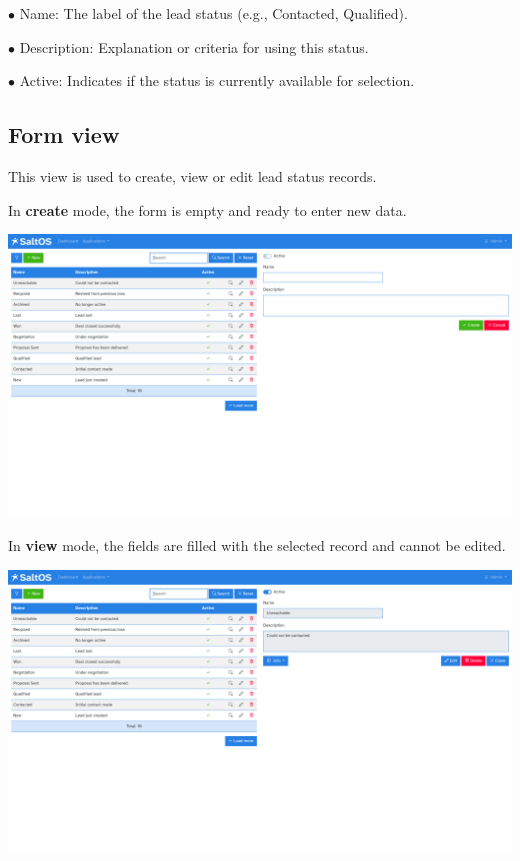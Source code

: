 \documentclass[a4paper]{article}
\begin{document}
\begin{compactitem}
\item[\color{myblue}$\bullet$] Name: The label of the lead status (e.g., Contacted, Qualified).
\item[\color{myblue}$\bullet$] Description: Explanation or criteria for using this status.
\item[\color{myblue}$\bullet$] Active: Indicates if the status is currently available for selection.
\end{compactitem}

\hypertarget{toc64}{}
\subsection{Form view}

This view is used to create, view or edit lead status records.

In \textbf{create} mode, the form is empty and ready to enter new data.

\begin{center}\includegraphics[width=1\textwidth]{../ujest/snaps/test-screenshots-js-screenshots-crm-leads-status-create-en-us-1-snap.png}\end{center}

In \textbf{view} mode, the fields are filled with the selected record and cannot be edited.

\begin{center}\includegraphics[width=1\textwidth]{../ujest/snaps/test-screenshots-js-screenshots-crm-leads-status-view-10-en-us-1-snap.png}\end{center}
\end{document}

